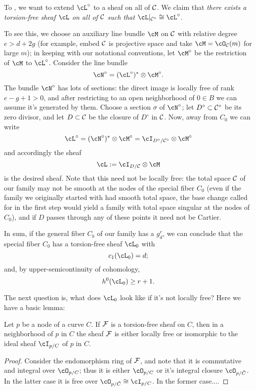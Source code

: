 %

To , we want to extend $\cL^\circ$ to a sheaf on all of $\cC$. We claim that \emph{there exists a torsion-free sheaf $\cL$ on all of $\cC$ such that $\cL|_{\cC^\circ} \cong \cL^\circ$}.

To see this, we choose an auxiliary line bundle $\cM$ on $\cC$ with relative degree $e > d + 2g$ (for example, embed $\cC$ is projective space and take $\cM = \cO_{\cC}(m)$ for large $m$); in keeping with our notational conventions, let $\cM^\circ$ be the restriction of $\cM$ to $\cL^\circ$. Consider the line bundle 
$$
\cN^\circ = (\cL^\circ)^* \otimes \cM^\circ.
$$
The bundle $\cN^\circ$ has lots of sections: the direct image is locally free of rank $e-g+1 > 0$, and after restricting to an open neighborhood of $0 \in B$ we can assume it's generated by them. Choose a section $\sigma$ of $\cN^\circ$; let $D^\circ \subset \cC^\circ$ be its zero divisor, and let $D \subset \cC$ be the closure of $D^\circ$ in $\cC$. Now, away from $C_0$ we can write
$$
\cL^\circ = (\cN^\circ)^* \otimes \cM^\circ = \cI_{D^\circ/\cC^\circ} \otimes \cM^\circ
$$
and accordingly the sheaf
$$
\cL := \cI_{D/\cC} \otimes \cM
$$
is the desired sheaf. Note that this need not be locally free: the total space $\cC$ of our family may not be smooth at the nodes of the special fiber $C_0$ (even if the family we originally started with had smooth total space, the base change called for in the first step would yield a family with  total space singular at the nodes of $C_0$), and if $D$ passes through any of these points it need not be Cartier.

In sum, if the general fiber $C_b$ of our family has a $g^r_d$, we can conclude that the special fiber $C_0$ has a torsion-free sheaf $\cL_0$ with 
$$
c_1(\cL_0) = d;
$$
and, by upper-semicontinuity of cohomology,
$$
h^0(\cL_0) \geq r+1.
$$

The next question is, what does $\cL_0$ look like if it's not locally free? Here we have a basic lemma:

\begin{lemma}\label{torsion free at node}
Let $p$ be a  node of a curve $C$. If $\cF$ is a torsion-free sheaf on $C$, then in a neighborhood of $p$ in $C$ the sheaf $\cF$ is either locally free or isomorphic to the ideal sheaf $\cI_{p/C}$ of $p$ in $C$.
\end{lemma}

\begin{proof}
Consider the endomorphism ring of $\cF$, and note that it is commutative and integral over $\cO_{p/C}$; thus it is either 
$\cO_{p/C}$ or it's integral closure $\cO_{p/\tilde C}$. In the latter case it is  free over $\cO_{p/\tilde C}\cong \cI_{p/C}$.
In the former case....

\end{proof}

